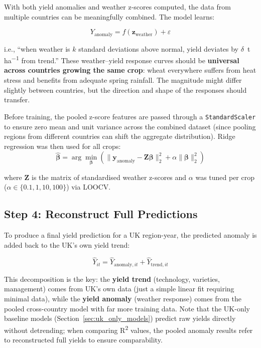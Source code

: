 \documentclass[12pt,a4paper]{report}
\newcommand{\rsq}{R\textsuperscript{2}}
\newcommand{\tha}{t\,ha\textsuperscript{$-1$}}
\begin{document}
With both yield anomalies and weather z-scores computed, the data from multiple countries can be meaningfully combined. The model learns:

\begin{equation}
    Y_{\text{anomaly}} = f(\mathbf{z}_{\text{weather}}) + \varepsilon
\end{equation}

\noindent i.e., ``when weather is $k$ standard deviations above normal, yield deviates by $\delta$~\tha{} from trend.'' These weather--yield response curves should be \textbf{universal across countries growing the same crop}: wheat everywhere suffers from heat stress and benefits from adequate spring rainfall. The magnitude might differ slightly between countries, but the direction and shape of the responses should transfer.

Before training, the pooled z-score features are passed through a \texttt{StandardScaler} to ensure zero mean and unit variance across the combined dataset (since pooling regions from different countries can shift the aggregate distribution). Ridge regression was then used for all crops:
\begin{equation}
    \hat{\boldsymbol{\beta}} = \arg\min_{\boldsymbol{\beta}} \left( \|\mathbf{y}_{\text{anomaly}} - \mathbf{Z}\boldsymbol{\beta}\|_2^2 + \alpha\|\boldsymbol{\beta}\|_2^2 \right)
\end{equation}

where $\mathbf{Z}$ is the matrix of standardised weather z-scores and $\alpha$ was tuned per crop ($\alpha \in \{0.1, 1, 10, 100\}$) via LOOCV.

\subsection{Step 4: Reconstruct Full Predictions}

To produce a final yield prediction for a UK region-year, the predicted anomaly is added back to the UK's own yield trend:

\begin{equation}
    \hat{Y}_{it} = \hat{Y}_{\text{anomaly},it} + \hat{Y}_{\text{trend},it}
\end{equation}

This decomposition is the key: the \textbf{yield trend} (technology, varieties, management) comes from UK's own data (just a simple linear fit requiring minimal data), while the \textbf{yield anomaly} (weather response) comes from the pooled cross-country model with far more training data. Note that the UK-only baseline models (Section~\ref{sec:uk_only_models}) predict raw yields directly without detrending; when comparing \rsq{} values, the pooled anomaly results refer to reconstructed full yields to ensure comparability.
\end{document}
